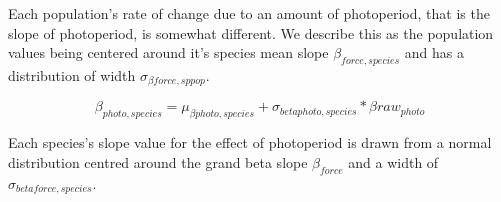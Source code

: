 \documentclass[11pt,letter]{article}
\begin{document}
Each population's rate of change due to an amount of photoperiod, that is the slope of photoperiod, is somewhat different. We describe this as the population values being centered around it's species mean slope $ \beta _{force, species}$ and has a distribution of width $\sigma_{\beta force,sppop} $. 


\begin{equation}
\beta_{photo,species}  = \mu_{\beta photo, species} + \sigma_{beta photo, species} * \beta raw_{photo}
\end{equation}

Each species's slope value for the effect of photoperiod is drawn from a normal distribution centred around the grand beta slope $\beta_{force}$ and a width of $\sigma_{beta force, species}$.







\end{document}
